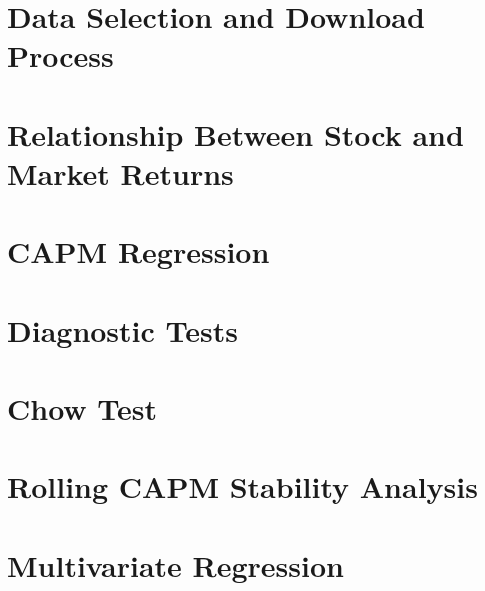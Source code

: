 \documentclass[12pt, openright, oneside]{report}
\begin{document}
\chapter{Data Selection and Download Process}
\label{chapter:download}

\chapter{Relationship Between Stock and Market Returns}\label{chapter:equity_returns}


\chapter{CAPM Regression}\label{chapter:linear_regression}


\chapter{Diagnostic Tests}\label{chapter:diagnostic_tests}


\chapter{Chow Test}\label{chapter:chow_test}


\chapter{Rolling CAPM Stability Analysis}\label{chapter:rolling}


\chapter{Multivariate Regression}\label{chapter:multivariate}

\end{document}
